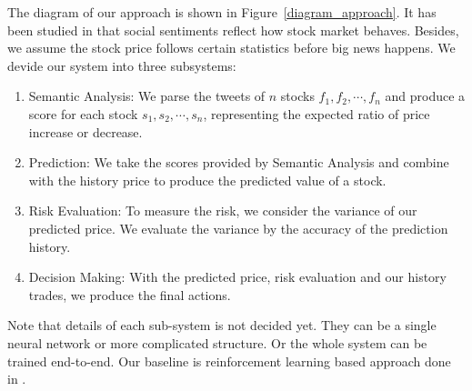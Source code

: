 \documentclass[a4paper, 11pt]{article}
\begin{document}
\begin{spacing}{1}
    The diagram of our approach is shown in Figure~\ref{diagram_approach}. It has been studied in \cite{social_relation_sentiment_analysis} that social sentiments reflect how stock market behaves. Besides, we assume the stock price follows certain statistics before big news happens. We devide our system into three subsystems:
    \begin{enumerate}
      \item Semantic Analysis: We parse the tweets of $n$ stocks $f_1, f_2, \cdots, f_n$ and produce a score for each stock $s_1, s_2, \cdots, s_n$, representing the expected ratio of price increase or decrease.
      \item Prediction: We take the scores provided by Semantic Analysis and combine with the history price to produce the predicted value of a stock.
      \item Risk Evaluation: To measure the risk, we consider the variance of our predicted price. We evaluate the variance by the accuracy of the prediction history.
      \item Decision Making: With the predicted price, risk evaluation and our history trades, we produce the final actions.
    \end{enumerate}
    Note that details of each sub-system is not decided yet. They can be a single neural network or more complicated structure. Or the whole system can be trained end-to-end. Our baseline is reinforcement learning based approach done in \cite{cs229_stanford_trading, cs229_stanford_portfolio}.
%    
%    
%    
  
  \end{spacing}  
  
  
\end{document}
